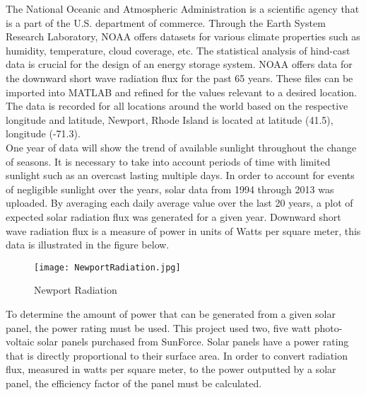 \indent The National Oceanic and Atmospheric Administration  is a scientific agency that is a part of the U.S. department of commerce. Through the Earth System Research Laboratory, NOAA offers datasets for various climate properties such as humidity, temperature, cloud coverage, etc. The statistical analysis of hind-cast data is crucial for the design of an energy storage system. NOAA offers data for the downward short wave radiation flux for the past 65 years. These files can be imported into MATLAB and refined for the values relevant to a desired location. The data is recorded for all locations around the world based on the respective longitude and latitude, Newport, Rhode Island is located at latitude (41.5), longitude (-71.3). \\

\indent One year of data will show the trend of available sunlight throughout the change of seasons. It is necessary to take into account periods of time with limited sunlight such as an overcast lasting multiple days. In order to account for events of negligible sunlight over the years, solar data from 1994 through 2013 was uploaded. By averaging each daily average value over the last 20 years, a plot of expected solar radiation flux was generated for a given year. Downward short wave radiation flux is a measure of power in units of Watts per square meter, this data is illustrated in the figure below.

\begin{figure}[H]
\centering
\texttt{[image: NewportRadiation.jpg]}
\caption{Newport Radiation}
\label{fig:NewportRadtiation}
\end{figure}

\indent To determine the amount of power that can be generated from a given solar panel, the power rating must be used. This project used two, five watt photo-voltaic solar panels purchased from SunForce. Solar panels have a power rating that is directly proportional to their surface area. In order to convert radiation flux, measured in watts per square meter, to the power outputted by a solar panel, the efficiency factor of the panel must be calculated.

